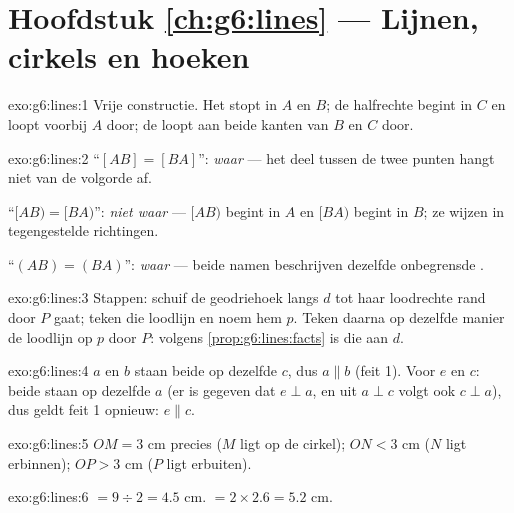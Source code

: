 \section*{Hoofdstuk \ref{ch:g6:lines} --- Lijnen, cirkels en hoeken}

\begin{solution}{exo:g6:lines:1}
Vrije constructie. Het  stopt in $A$ en $B$; de halfrechte begint in
$C$ en loopt voorbij $A$ door; de  loopt aan beide kanten van $B$ en $C$
door.
\end{solution}

\begin{solution}{exo:g6:lines:2}
``$[AB] = [BA]$'': \emph{waar} --- het deel tussen de twee punten hangt niet
van de volgorde af.

``$[AB) = [BA)$'': \emph{niet waar} --- $[AB)$ begint in $A$ en $[BA)$ begint
in $B$; ze wijzen in tegengestelde richtingen.

``$(AB) = (BA)$'': \emph{waar} --- beide namen beschrijven dezelfde onbegrensde
.
\end{solution}

\begin{solution}{exo:g6:lines:3}
Stappen: schuif de geodriehoek langs $d$ tot haar loodrechte rand door $P$
gaat; teken die loodlijn en noem hem $p$. Teken daarna op dezelfde manier de
loodlijn op $p$ door $P$: volgens \cref{prop:g6:lines:facts} is die 
aan $d$.
\end{solution}

\begin{solution}{exo:g6:lines:4}
$a$ en $b$ staan beide  op dezelfde  $c$, dus $a \parallel b$
(feit 1). Voor $e$ en $c$: beide staan  op dezelfde  $a$ (er is
gegeven dat $e \perp a$, en uit $a \perp c$ volgt ook $c \perp a$), dus geldt
feit 1 opnieuw: $e \parallel c$.
\end{solution}

\begin{solution}{exo:g6:lines:5}
$OM = 3$ cm precies ($M$ ligt op de cirkel); $ON < 3$ cm ($N$ ligt erbinnen);
$OP > 3$ cm ($P$ ligt erbuiten).
\end{solution}

\begin{solution}{exo:g6:lines:6}
 $= 9 \div 2 = 4.5$ cm. \quad {} $= 2 \times 2.6 = 5.2$ cm.
\end{solution}

